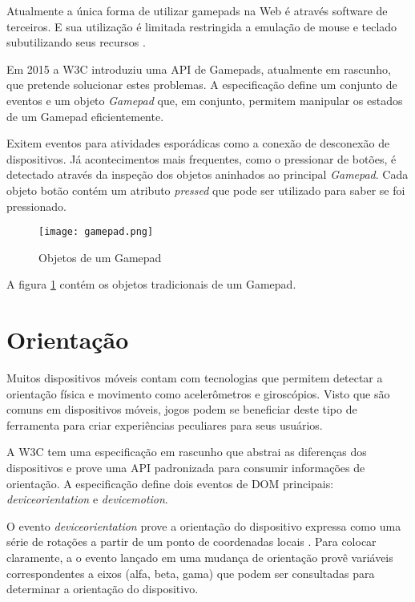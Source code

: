 Atualmente a única forma de utilizar gamepads na Web é
através software de terceiros. E sua utilização é limitada
restringida a emulação de mouse e teclado subutilizando seus
recursos \autocite{gamepad}.

Em 2015 a W3C introduziu uma API de Gamepads, atualmente em rascunho,
que pretende solucionar estes problemas. A especificação define um
conjunto de eventos e um objeto \textit{Gamepad} que, em conjunto,
permitem manipular os estados de um Gamepad eficientemente.

Exitem eventos para atividades esporádicas como a conexão de
desconexão de dispositivos. Já acontecimentos mais frequentes, como o
pressionar de botões, é detectado através da inspeção dos objetos
aninhados ao principal \textit{Gamepad}. Cada objeto botão contém um 
atributo \textit{pressed} que pode ser utilizado para saber se foi pressionado.

\begin{figure}[H]
    \centering
    \texttt{[image: gamepad.png]}
    \caption{Objetos de um Gamepad}
    \label{fig:gamepad}
\end{figure}

A figura \ref{fig:gamepad} contém os objetos tradicionais de um Gamepad.

\section{Orientação}
Muitos dispositivos móveis contam com tecnologias que permitem detectar
a orientação física e movimento como acelerômetros e giroscópios.
Visto que são comuns em dispositivos móveis, jogos podem se beneficiar
deste tipo de ferramenta para criar experiências peculiares para seus
usuários.

A W3C tem uma especificação em rascunho que abstrai as diferenças dos
dispositivos e prove uma API padronizada para consumir informações
de orientação. A especificação define dois eventos de DOM
principais: \textit{deviceorientation} e \textit{devicemotion}. 

O evento \textit{deviceorientation} prove a orientação do
dispositivo expressa como uma série de rotações a partir de um
ponto de coordenadas locais \autocite{orientationSpec}. Para colocar
claramente, a o evento lançado em uma mudança de orientação provê
variáveis correspondentes a eixos (alfa, beta, gama) que podem ser
consultadas para determinar a orientação do dispositivo.

